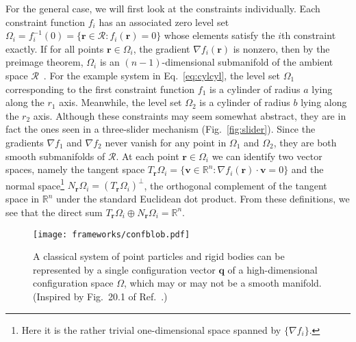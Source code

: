 For the general case, we will first look at the constraints individually.
Each constraint function $f_i$ has an associated zero level set $\Omega_i = f_i^{-1}(0) = \{\bm{r} \in \mathscr{R}: f_i(\bm{r}) = 0\}$ whose elements satisfy the $i$th constraint exactly.
If for all points $\bm{r} \in \Omega_{i}$, the gradient $\nabla f_i(\bm{r})$ is nonzero, then by the preimage theorem, $\Omega_i$ is an $(n-1)$-dimensional submanifold of the ambient space $\mathscr{R}$~\cite{guillemin1974,lee2013}.
For the example system in Eq.~\eqref{eq:cylcyl}, the level set $\Omega_1$ corresponding to the first constraint function $f_1$ is a cylinder of radius $a$ lying along the $r_{1}$ axis.
Meanwhile, the level set $\Omega_2$ is a cylinder of radius $b$ lying along the $r_{2}$ axis.
Although these constraints may seem somewhat abstract, they are in fact the ones seen in a three-slider mechanism (Fig.~\ref{fig:slider}).
Since the gradients $\nabla f_1$ and $\nabla f_2$ never vanish for any point in $\Omega_1$ and $\Omega_2$, they are both smooth submanifolds of $\mathscr{R}$.
At each point $\bm{r} \in \Omega_i$ we can identify two vector spaces, namely the tangent space $T_{\bm{r}}\Omega_i = \{\bm{v} \in \mathbb{R}^n: \nabla f_i(\bm{r})\cdot \bm{v} = 0\}$ and the normal space\footnote{Here it is the rather trivial one-dimensional space spanned by $\{\nabla f_i\}$.} $N_{\bm{r}}\Omega_i = (T_{\bm{r}}\Omega_i)^\perp$, the orthogonal complement of the tangent space in $\mathbb{R}^n$ under the standard Euclidean dot product.
From these definitions, we see that the direct sum $T_{\bm{r}}\Omega_i\oplus N_{\bm{r}}\Omega_i = \mathbb{R}^n$.
%
\begin{figure}
  \begin{center}
    \texttt{[image: frameworks/confblob.pdf]}
  \end{center}
  \caption{A classical system of point particles and rigid bodies can be represented by a single configuration vector $\bm{q}$ of a high-dimensional configuration space $\Omega$, which may or may not be a smooth manifold. (Inspired by Fig.~20.1 of Ref.~\cite{penrose2004}.)}
  \label{fig:confblob}
\end{figure}

